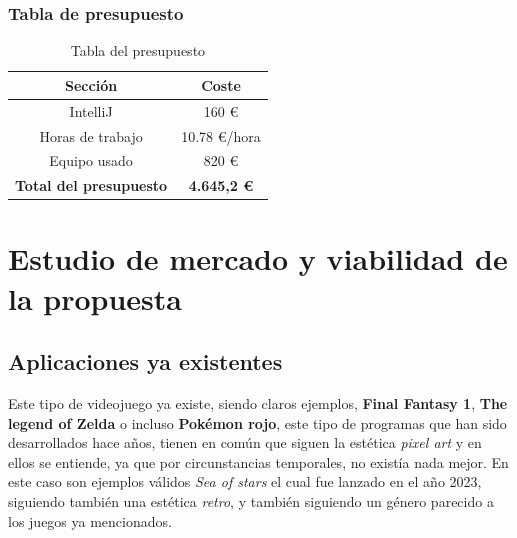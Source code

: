 \documentclass[a4paper]{article}
\begin{document}
\subsubsection{Tabla de presupuesto}
\begin{table}[ht]
    \centering
    \begin{tabular}{|c|c|}
        \hline
        \textbf{Sección}               & \textbf{Coste}      \\
        \hline
        IntelliJ                       & 160 €           \\
        \hline
        Horas de trabajo               & 10.78 €/hora     \\
        \hline
        Equipo usado                   & 820 €           \\
        \hline
        \textbf{Total del presupuesto} & \textbf{4.645,2 €} \\
        \hline
    \end{tabular}
    \caption{Tabla del presupuesto}
    \label{tab:presupuesto-table}
\end{table}


\clearpage
\section{Estudio de mercado y viabilidad de la propuesta}
\subsection{Aplicaciones ya existentes}
Este tipo de videojuego ya existe, siendo claros ejemplos, \textbf{Final Fantasy 1}, \textbf{The legend of Zelda} o incluso \textbf{Pokémon rojo}, este tipo de
programas que han sido desarrollados hace años, tienen en común que siguen la estética \textit{pixel art} y en ellos se entiende, ya que por circunstancias temporales,
no existía nada mejor. En este caso son ejemplos válidos \textit{Sea of stars} el cual fue lanzado en el año 2023, siguiendo también una estética \textit{retro}, y también siguiendo
un género parecido a los juegos ya mencionados.
\end{document}
